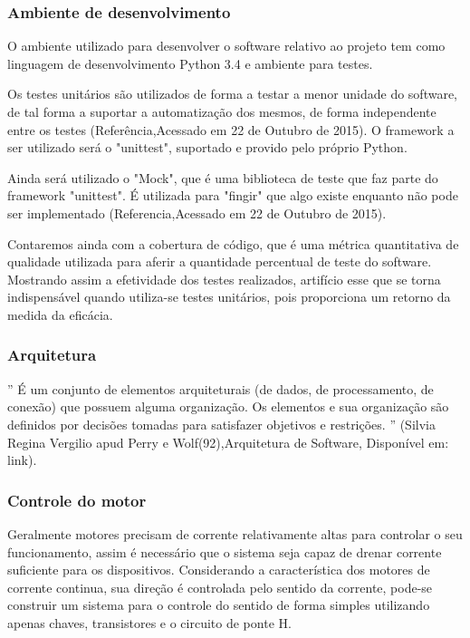 \subsubsection{Ambiente de desenvolvimento}

O ambiente utilizado para desenvolver o software relativo ao projeto tem como linguagem de desenvolvimento Python 3.4 e ambiente para testes.

Os testes unitários são utilizados de forma a testar a menor unidade do software, de tal forma a suportar a automatização dos mesmos, de forma independente entre os testes (Referência,Acessado em 22 de Outubro de 2015). O framework a ser utilizado será o "unittest", suportado e provido pelo próprio Python.

Ainda será utilizado o "Mock", que é uma biblioteca de teste que faz parte do framework "unittest". É utilizada para "fingir" que algo existe enquanto não pode ser implementado (Referencia,Acessado em 22 de Outubro de 2015).

Contaremos ainda com a cobertura de código, que é uma métrica quantitativa de qualidade utilizada para aferir a quantidade percentual de teste do software. Mostrando assim a efetividade dos testes realizados, artifício esse que se torna indispensável quando utiliza-se testes unitários, pois proporciona um retorno da medida da eficácia.

\subsubsection{Arquitetura}

'' É um conjunto de elementos arquiteturais (de dados, de processamento, de conexão) que possuem alguma organização. Os elementos e sua organização são definidos por decisões tomadas para satisfazer objetivos e restrições. '' (Silvia Regina Vergilio apud Perry e Wolf(92),Arquitetura de Software, Disponível em: link).

\subsubsection{Controle do motor}

Geralmente motores precisam de corrente relativamente altas para controlar o seu funcionamento, assim é necessário que o sistema seja capaz de drenar corrente suficiente para os dispositivos. Considerando a característica dos motores de corrente continua, sua direção é controlada pelo sentido da corrente, pode-se construir um sistema para o controle do sentido de forma simples utilizando apenas chaves, transistores e o circuito de ponte H.

